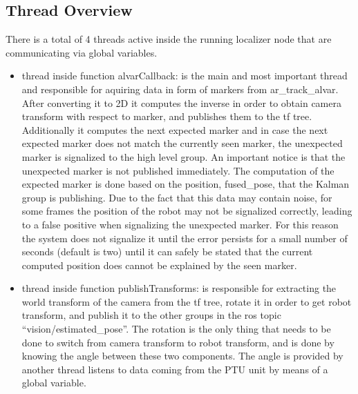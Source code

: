 \subsection{Thread Overview}
There is a total of 4 threads active inside the running localizer node that are communicating via global variables.

\begin{itemize}
\item thread inside function alvarCallback: is the main and most important thread and responsible for aquiring data in form of markers from ar\_track\_alvar. After converting it to 2D it computes the inverse in order to obtain camera transform with respect to marker, and publishes them to the tf tree. Additionally it computes the next expected marker and in case the next expected marker does not match the currently seen marker, the unexpected marker is signalized to the high level group. An important notice is that the unexpected marker is not published immediately. The computation of the expected marker is done based on the position, fused\_pose, that the Kalman group is publishing. Due to the fact that this data may contain noise, for some frames the position of the robot may not be signalized correctly, leading to a false positive when signalizing the unexpected marker. For this reason the system does not signalize it until the error persists for a small number of seconds (default is two) until it can safely be stated that the current computed position does cannot be explained by the seen marker.
\item thread inside function publishTransforms: is responsible for extracting the world transform  of the camera from the tf tree, rotate it in order to get robot transform, and publish it to the other groups in the ros topic “vision/estimated\_pose”. The rotation is the only thing that needs to be done to switch from camera transform to robot transform, and is done by knowing the angle between these two components. The angle is provided by another thread listens to data coming from the PTU unit by means of a global variable.

\end{itemize}
